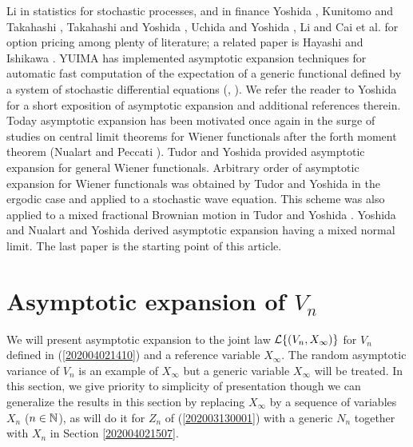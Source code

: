 \documentclass[a4paper,12pt]{article}
\numberwithin{equation}{section}
\numberwithin{equation}{section}
\newcommand{\colorb}{\color[rgb]{0,0,0.8}}
\newcommand{\colorb}{\color{black}}%
\newcommand{\sred}{\color[rgb]{0.8,0,0}}
\newcommand{\sred}{\color{black}}%
\begin{document}
Li \cite{li2013maximum} 
in statistics for stochastic processes, 
and in finance 
Yoshida \cite{Yoshida1992a}, 
Kunitomo and Takahashi \cite{KunitomoTakahashi2001}, 
Takahashi and Yoshida \cite{TakahashiYoshida2004, TakahashiYoshida2005}, 
Uchida and Yoshida \cite{UchidaYoshida2004b}, 
Li \cite{li2014closed, li2016estimating} and Cai et al. \cite{cai2014closed} 
for option pricing among plenty of %
literature; 
a related paper is Hayashi and Ishikawa \cite{hayashi2012composition}. 
YUIMA has implemented asymptotic expansion techniques 
for automatic fast computation of the expectation of a generic functional defined 
by a system of stochastic differential equations 
(\cite{Yuima2014}, \cite{iacus2017simulation}). 
%
We refer the reader to Yoshida \cite{yoshida2016asymptotic} for a short exposition of  
asymptotic expansion and additional references therein. 
%
Today asymptotic expansion has been motivated once again 
in the surge of studies on central limit theorems for Wiener functionals after the forth moment theorem 
(Nualart and Peccati \cite{nualart2005central}). 
%
Tudor and Yoshida \cite{tudor2019asymptotic} provided 
asymptotic expansion for general Wiener functionals. 
Arbitrary order of asymptotic expansion for Wiener functionals was obtained by 
Tudor and Yoshida \cite{tudor2019high} in the ergodic case and applied to a stochastic wave equation. 
{\sred This scheme was also applied to a mixed fractional Brownian motion 
in Tudor and Yoshida \cite{tudor2020asymptotic}.} 
Yoshida \cite{yoshida2013martingale} and Nualart and Yoshida \cite{nualart2019asymptotic} derived asymptotic expansion having a mixed normal limit. 
The last paper is the starting point of this article. 



\section{Asymptotic expansion of {\colorb$V_n$} %
}\label{202003141649}
{\colorb
We will present asymptotic expansion to the joint law ${\cal L}\{(V_n,X_\infty)\}$ 
for $V_n$ defined in (\ref{202004021410}) and a reference variable $X_\infty$. 
The random asymptotic variance of $V_n$ is an example of $X_\infty$ but 
a generic variable $X_\infty$ will be treated. 
In this section, we give priority to simplicity of presentation though 
we can generalize the results in this section by replacing $X_\infty$ 
by a sequence of variables $X_n$ ($n\in{\mathbb N}$), as will do 
it for $Z_n$ of (\ref{202003130001}) with a generic $N_n$ together with $X_n$ 
in Section \ref{202004021507}. 
}
\end{document}
